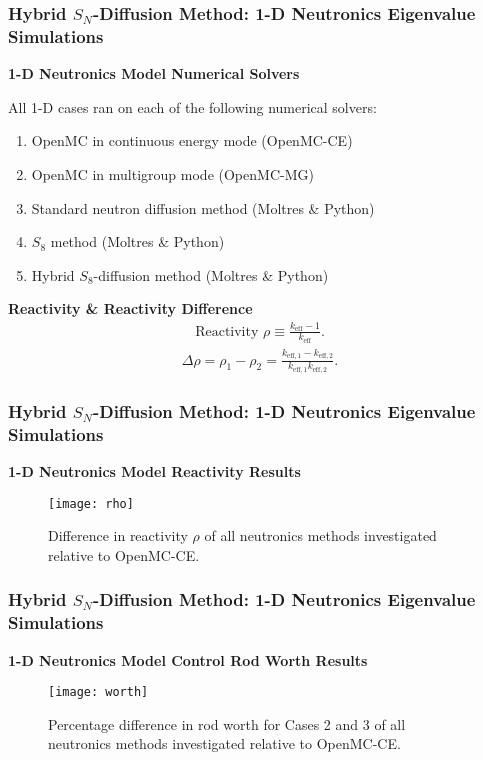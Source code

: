 \begin{frame}
  \frametitle{Hybrid $S_N$-Diffusion Method: 1-D Neutronics Eigenvalue Simulations}
  \textbf{1-D Neutronics Model Numerical Solvers}
  \vspace{.2cm}

  All 1-D cases ran on each of the following numerical solvers:
  \begin{enumerate}
    \item OpenMC in continuous energy mode (OpenMC-CE)
    \item OpenMC in multigroup mode (OpenMC-MG)
    \item Standard neutron diffusion method (Moltres \& Python)
    \item $S_8$ method (Moltres \& Python)
    \item Hybrid $S_8$-diffusion method (Moltres \& Python)
  \end{enumerate}
  \vspace{.2cm}

  \textbf{Reactivity \& Reactivity Difference}
  \begin{gather}
    \mbox{Reactivity } \rho \equiv \frac{k_\text{eff}-1}{k_\text{eff}}.
  \end{gather}
  \begin{gather}
    \Delta\rho = \rho_1 - \rho_2 =
    \frac{k_{\text{eff},1}-k_{\text{eff},2}}{k_{\text{eff},1}k_{\text{eff},2}}.
  \end{gather}
\end{frame}

\begin{frame}
  \frametitle{Hybrid $S_N$-Diffusion Method: 1-D Neutronics Eigenvalue Simulations}
  \textbf{1-D Neutronics Model Reactivity Results}
  \begin{figure}[h]
    \centering
    \texttt{[image: rho]}
    \caption{Difference in reactivity $\rho$ of all neutronics methods investigated relative
    to OpenMC-CE.}
    \label{fig:1d-rho}
  \end{figure}
\end{frame}

\begin{frame}
  \frametitle{Hybrid $S_N$-Diffusion Method: 1-D Neutronics Eigenvalue Simulations}
  \textbf{1-D Neutronics Model Control Rod Worth Results}
  \begin{figure}[h]
    \centering
    \texttt{[image: worth]}
    \caption{Percentage difference in rod worth for Cases 2 and 3 of all neutronics methods
    investigated relative to OpenMC-CE.}
    \label{fig:1d-worth}
  \end{figure}
\end{frame}

